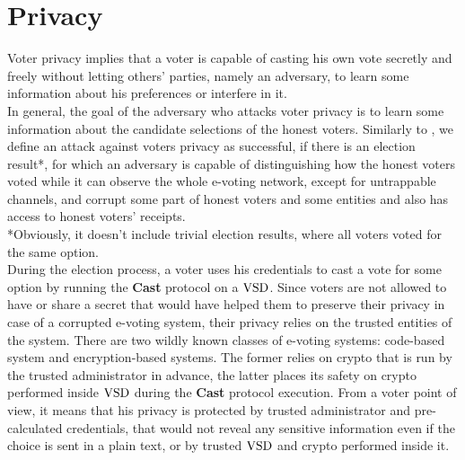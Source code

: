 \chapter{Privacy}

Voter privacy implies that a voter is capable of casting his own vote secretly and freely without letting others' parties, namely an adversary, to learn some information about his preferences or interfere in it.\\

In general, the goal of the adversary who attacks voter privacy is to learn some information about the candidate selections of the honest voters. Similarly to \cite{Kiayias2015}, we define an attack against voters privacy as successful, if there is an election result*, for which an adversary is capable of distinguishing how the honest voters voted while it can observe the whole e-voting network, except for untrappable channels, and corrupt some part of honest voters and some entities and also has access to honest voters' receipts. \\

*Obviously, it doesn't include trivial election results, where all voters voted for the same option. \\

During the election process, a voter uses his credentials to cast a vote for some option by running the \textbf{Cast} protocol on a $\operatorname{VSD}$. Since voters are not allowed to have or share a secret that would have helped them to preserve their privacy in case of a corrupted e-voting system, their privacy relies on the trusted entities of the system. There are two wildly known classes of e-voting systems: code-based system and encryption-based systems. The former relies on crypto that is run by the trusted administrator in advance, the latter places its safety on crypto performed inside $\operatorname{VSD}$ during the \textbf{Cast} protocol execution. From a voter point of view, it means that his privacy is protected by trusted administrator and pre-calculated credentials, that would not reveal any sensitive information even if the choice is sent in a plain text, or by trusted $\operatorname{VSD}$ and crypto performed inside it. \\


